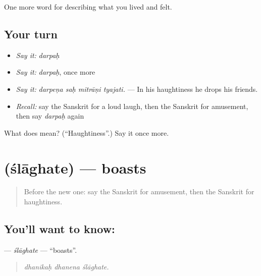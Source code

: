 \begin{grammarlens}[title={What you've built}]
One more word for describing what you lived and felt.
\end{grammarlens}

\subsection*{Your turn}
\begin{itemize}
\raggedright
  \item \emph{Say it:} \emph{darpaḥ}
  \item \emph{Say it:} \emph{darpaḥ}, once more
  \item \emph{Say it:} \emph{darpeṇa saḥ mitrāṇi tyajati.} — In his haughtiness he drops his friends.
  \item \emph{Recall:} say the Sanskrit for a loud laugh, then the Sanskrit for amusement, then say \emph{darpaḥ} again
\end{itemize}

\begin{tcolorbox}[breakable,colback=teal!4,colframe=teal!35!black,title={Before you move on}]
What does  mean? (\textquotedblleft{}Haughtiness\textquotedblright{}.) Say it once more.
\end{tcolorbox}
\section[\texorpdfstring{\sk{श्लाघते} (ślāghate)}{श्लाघते (ślāghate)}]{ (ślāghate) — boasts}

\label{lesson:SA-C458-slaghate}



\begin{quote}
Before the new one: say the Sanskrit for amusement, then the Sanskrit for haughtiness.
\end{quote}

\subsection*{You'll want to know: }
\textbf{} — \emph{ślāghate} — \textquotedblleft{}boasts\textquotedblright{}.

\begin{quote}
  
\end{quote}

\begin{quote}
\emph{dhanikaḥ dhanena ślāghate.}
\end{quote}

